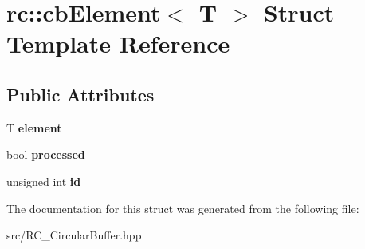 \hypertarget{structrc_1_1cbElement}{\section{rc\+:\+:cb\+Element$<$ T $>$ Struct Template Reference}
\label{structrc_1_1cbElement}
}
\subsection*{Public Attributes}
\begin{DoxyCompactItemize}
\item 
\hypertarget{structrc_1_1cbElement_a9e0ab0b1cc53698c5aedf11997ffd261}{T {\bfseries element}}\label{structrc_1_1cbElement_a9e0ab0b1cc53698c5aedf11997ffd261}

\item 
\hypertarget{structrc_1_1cbElement_a721d493bd93248172628c48c4526f105}{bool {\bfseries processed}}\label{structrc_1_1cbElement_a721d493bd93248172628c48c4526f105}

\item 
\hypertarget{structrc_1_1cbElement_a101e7ac69a01db74bf72a1a2b768a6d6}{unsigned int {\bfseries id}}\label{structrc_1_1cbElement_a101e7ac69a01db74bf72a1a2b768a6d6}

\end{DoxyCompactItemize}


The documentation for this struct was generated from the following file\+:\begin{DoxyCompactItemize}
\item 
src/R\+C\+\_\+\+Circular\+Buffer.\+hpp\end{DoxyCompactItemize}
